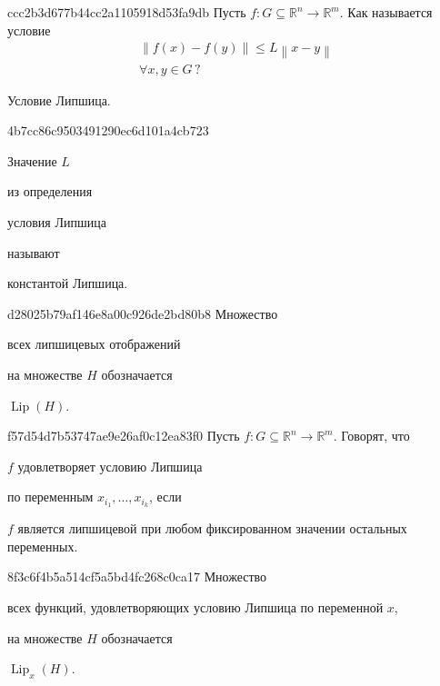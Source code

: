\begin{note}{ccc2b3d677b44cc2a1105918d53fa9db}
    Пусть \({ f : G \subseteq \mathbb R^{n} \to \mathbb R^{m} }\).
    Как называется условие
    \begin{gather*}
        \left\lVert f(x) - f(y) \right\rVert \leqslant L\left\lVert x - y \right\rVert \\
        \forall x, y \in G\,?
    \end{gather*}

    \begin{cloze}{1}
        Условие Липшица.
    \end{cloze}
\end{note}

\begin{note}{4b7cc86c9503491290ec6d101a4cb723}
    \begin{icloze}{2}Значение \({ L }\)\end{icloze} из определения \begin{icloze}{2}условия Липшица\end{icloze} называют \begin{icloze}{1}константой Липшица.\end{icloze}
\end{note}

\begin{note}{d28025b79af146e8a00c926de2bd80b8}
    Множество \begin{icloze}{2}всех липшицевых отображений\end{icloze} на множестве \({ H }\) обозначается \begin{icloze}{1}\({ \operatorname{Lip}(H) }\).\end{icloze}
\end{note}

\begin{note}{f57d54d7b53747ae9e26af0c12ea83f0}
    Пусть \({ f : G \subseteq \mathbb R^{n} \to \mathbb R^{m} }\).
    Говорят, что \begin{icloze}{2}\({ f }\) удовлетворяет условию Липшица\end{icloze} по переменным \({ x_{i_1}, \ldots, x_{i_k} }\), если
    \begin{icloze}{1}
        \({ f }\) является липшицевой при любом фиксированном значении остальных переменных.
    \end{icloze}
\end{note}

\begin{note}{8f3c6f4b5a514cf5a5bd4fc268c0ca17}
    Множество \begin{icloze}{2}всех функций, удовлетворяющих условию Липшица по переменной \({ x }\),\end{icloze} на множестве \({ H }\) обозначается \begin{icloze}{1}\({ \operatorname{Lip}_x (H) }\).\end{icloze}
\end{note}

